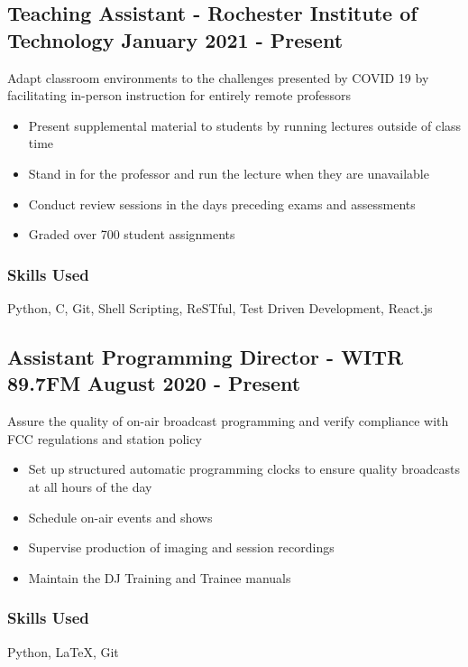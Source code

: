 \documentclass[11pt, letterpaper]{article}
\begin{document}
        \subsection{Teaching Assistant - Rochester Institute of Technology \hfill January 2021 - Present}
            Adapt classroom environments to the challenges presented by COVID 19 by facilitating in-person
            instruction for entirely remote professors
            \begin{itemize}[nosep]
                \item Present supplemental material to students by running lectures outside of
                        class time
                \item Stand in for the professor and run the lecture when they are unavailable
                \item Conduct review sessions in the days preceding exams and assessments
                \item Graded over 700 student assignments
            \end{itemize}
            \subsubsection{Skills Used}
                Python, C, Git, Shell Scripting, ReSTful, Test Driven Development, React.js
        \subsection{Assistant Programming Director - WITR 89.7FM \hfill August 2020 - Present}
            Assure the quality of on-air broadcast programming and verify compliance with FCC
            regulations and station policy
            \begin{itemize}[nosep]
                \item Set up structured automatic programming clocks to ensure quality broadcasts
                at all hours of the day
                \item Schedule on-air events and shows
                \item Supervise production of imaging and session recordings
                \item Maintain the DJ Training and Trainee manuals
            \end{itemize}
            \subsubsection{Skills Used}
                Python, \LaTeX, Git
\end{document}
